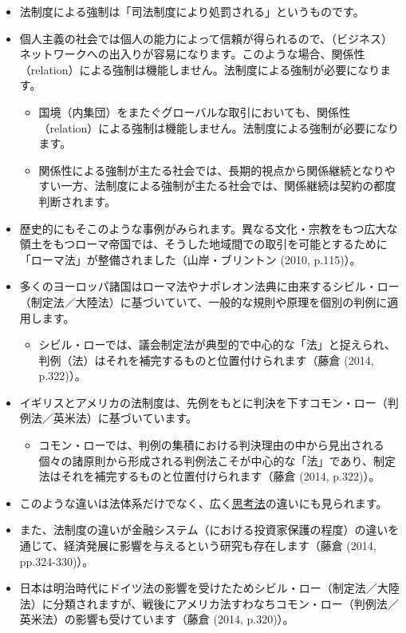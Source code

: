 \documentclass[
]{book}
\providecommand{\tightlist}{%
  \setlength{\itemsep}{0pt}\setlength{\parskip}{0pt}}
\begin{document}
\begin{itemize}
\item
  法制度による強制は「司法制度により処罰される」というものです。
\item
  個人主義の社会では個人の能力によって信頼が得られるので、（ビジネス）ネットワークへの出入りが容易になります。このような場合、関係性（relation）による強制は機能しません。法制度による強制が必要になります。

  \begin{itemize}
  \item
    国境（内集団）をまたぐグローバルな取引においても、関係性（relation）による強制は機能しません。法制度による強制が必要になります。
  \item
    関係性による強制が主たる社会では、長期的視点から関係継続となりやすい一方、法制度による強制が主たる社会では、関係継続は契約の都度判断されます。
  \end{itemize}
\item
  歴史的にもそこのような事例がみられます。異なる文化・宗教をもつ広大な領土をもつローマ帝国では、そうした地域間での取引を可能とするために「ローマ法」が整備されました（山岸・ブリントン (2010, p.115)）。
\item
  多くのヨーロッパ諸国はローマ法やナポレオン法典に由来するシビル・ロー（制定法／大陸法）に基づいていて、一般的な規則や原理を個別の判例に適用します。

  \begin{itemize}
  \tightlist
  \item
    シビル・ローでは、議会制定法が典型的で中心的な「法」と捉えられ、判例（法）はそれを補完するものと位置付けられます（藤倉 (2014, p.322)）。
    \\
  \end{itemize}
\item
  イギリスとアメリカの法制度は、先例をもとに判決を下すコモン・ロー（判例法／英米法）に基づいています。

  \begin{itemize}
  \tightlist
  \item
    コモン・ローでは、判例の集積における判決理由の中から見出される個々の諸原則から形成される判例法こそが中心的な「法」であり、制定法はそれを補完するものと位置付けられます（藤倉 (2014, p.322)）。
    \\
  \end{itemize}
\item
  このような違いは法体系だけでなく、広く\protect\hyperlink{meyer}{思考法}の違いにも見られます。
\item
  また、法制度の違いが金融システム（における投資家保護の程度）の違いを通じて、経済発展に影響を与えるという研究も存在します（藤倉 (2014, pp.324-330)）。
\item
  日本は明治時代にドイツ法の影響を受けたためシビル・ロー（制定法／大陸法）に分類されますが、戦後にアメリカ法すわなちコモン・ロー（判例法／英米法）の影響も受けています（藤倉 (2014, p.320)）。
\end{itemize}
\end{document}
